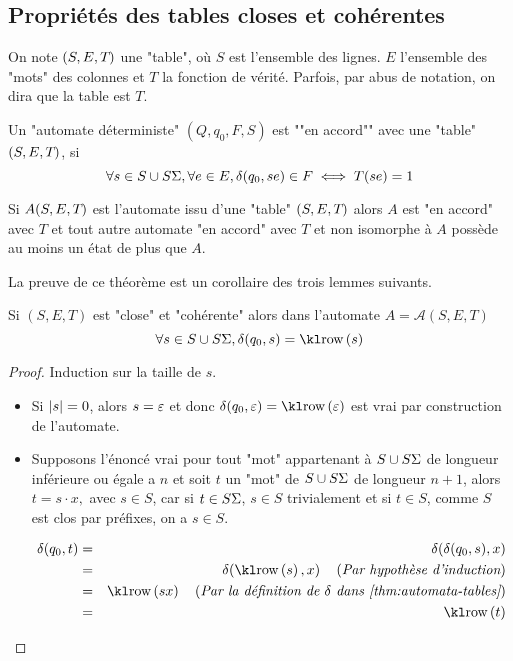 \subsection{Propriétés des tables closes et cohérentes}

\begin{notation}
	On note $(S, E, T_{})$ une "table", où $S$ est l'ensemble des lignes. $E$ l'ensemble des "mots" des colonnes et $T$ la fonction de vérité.
	Parfois, par abus de notation, on dira que la table est $T$.
\end{notation}

\begin{definition}
	Un "automate déterministe" $(Q, q_0, F, S)$ est ""en accord"" avec une "table" $(S, E, T_{})$, si
	$$ \forall s \in S \cup S\Sigma, \forall e \in E, \delta(q_0,se) \in F \iff T(se) = 1$$
\end{definition}

\begin{theorem}
	Si $A(S, E, T_{})$ est l'automate issu d'une "table" $(S, E, T_{})$ alors $A$ est "en accord" avec $T$ et tout autre
	automate "en accord" avec $T$ et non isomorphe à $A$ possède au moins un état de plus que $A$.
\end{theorem}

La preuve de ce théorème est un corollaire des trois lemmes suivants.

\begin{lemma} \label{lem:learning-9}
	Si $(S,E,T)$ est "close" et "cohérente" alors dans l'automate $A = \mathcal A (S,E,T)$
	$$\forall s \in S \cup S\alphabet, \delta(q_0,s) = \row s$$
\end{lemma}

\begin{proof}
	Induction sur la taille de $s$.
	\begin{itemize}
		\item Si $|s| = 0$, alors $s = \varepsilon$ et donc $\delta(q_0, \motvide) = \row \motvide$
		      est vrai par construction de l'automate.
		\item Supposons l'énoncé vrai pour tout "mot" appartenant à $S \cup S\Sigma$ de longueur inférieure ou égale a $n$ et
		      soit $t$ un "mot" de $S \cup S\Sigma$ de longueur $n +1$, alors $ t  = s \cdot x,$ avec $s \in S$, car
		      si $t \in S\Sigma$, $s \in S$ trivialement et si $t \in S$, comme $S$ est clos par préfixes, on a $s \in S$.

		      \begin{eqnarray*}
			      \delta(q_0, t) &=& \delta(\delta(q_0, s), x) \\
			      &=& \delta(\row s, x)  \reason {Par hypothèse d'induction} \\
			      &=& \row {sx}  \reason {Par la définition de $\delta$ dans \ref{thm:automata-tables}} \\
			      &=& \row t
		      \end{eqnarray*}
	\end{itemize}
\end{proof}


